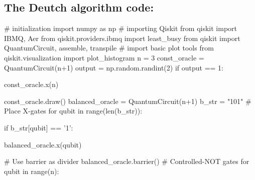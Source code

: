 \documentclass{article}
\begin{document}
\subsection{The Deutch algorithm code:}
\scriptsize{
\# initialization
\newline
import numpy as np
\newline
\newline
\# importing Qiskit
\newline
from qiskit import IBMQ, Aer
\newline
from qiskit.providers.ibmq import least\_busy
\newline
from qiskit import QuantumCircuit, assemble, transpile
\newline
\newline
\# import basic plot tools
\newline
from qiskit.visualization import plot\_histogram
\newline
n = 3
\newline
\newline
const\_oracle = QuantumCircuit(n+1)
\newline
\newline
output = np.random.randint(2)
\newline
if output == 1:

\hspace{0.5cm}
\begin{minipage}{0.3\textwidth}
 const\_oracle.x(n)
 \end{minipage}
\newline
\newline
const\_oracle.draw()
\newline
balanced\_oracle = QuantumCircuit(n+1)
\newline
b\_str = "101"
\newline
\newline
\# Place X-gates
\newline
for qubit in range(len(b\_str)):

\hspace{0.5cm}
\begin{minipage}{0.3\textwidth}
if b\_str[qubit] == '1':
 \end{minipage}

\hspace{1cm}
\begin{minipage}{0.3\textwidth}
 balanced\_oracle.x(qubit)
 \end{minipage}
\newline
\# Use barrier as divider
\newline
balanced\_oracle.barrier()
\newline
\newline
\# Controlled-NOT gates
\newline
for qubit in range(n):

}
\end{document}
